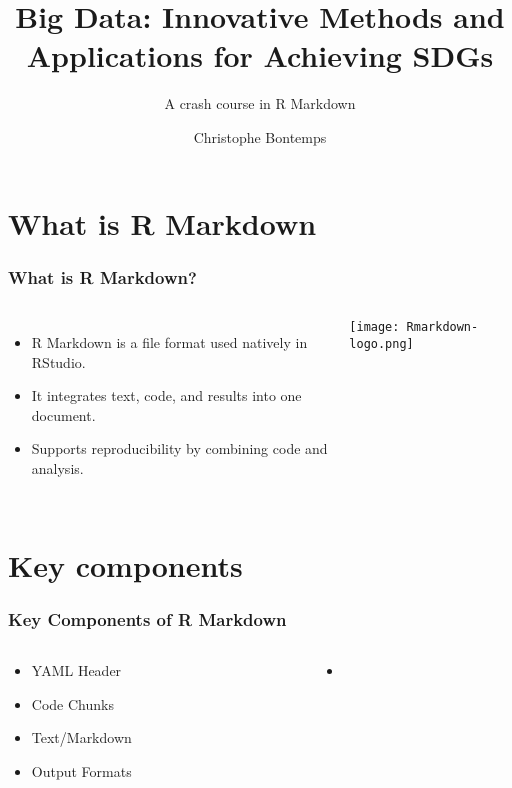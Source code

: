 \documentclass[xcolor=x11names,compress]{beamer}
\title{\textcolor{siap}{Big Data: Innovative Methods and Applications for Achieving SDGs \\ \vspace{0.5cm} }}
\subtitle{\textcolor{brique}{\Large{A crash course in R Markdown}}}
\author{Christophe Bontemps}
\institute{ \texttt{[image: SIAP\_logo\_Big.png]}}
\date{}
\renewcommand{\(}{\begin{columns}}
\renewcommand{\)}{\end{columns}}
\newcommand{\<}[1]{\begin{column}{#1}}
\renewcommand{\>}{\end{column}}
\begin{document}
\begin{frame}
    \titlepage
\end{frame}

\section{What is R Markdown}

\begin{frame}
    \frametitle{What is R Markdown?}
    \begin{columns}
            \begin{itemize}[<+->]
                \item R Markdown is a file format used natively in RStudio.
                \item It integrates text, code, and results into one document.
                \item Supports reproducibility by combining code and analysis.
            \end{itemize}
            \texttt{[image: Rmarkdown-logo.png]} %
    \end{columns}
\end{frame}

\section{Key components}
\begin{frame}
    \frametitle{Key Components of R Markdown}
    \begin{columns}
         \begin{column}{0.35\textwidth}
            \begin{itemize}[<+->]
                \item YAML Header
                \item Code Chunks
                \item Text/Markdown
                \item Output Formats
            \end{itemize}
        \end{column}
        \begin{column}{0.65\textwidth}
            \begin{itemize}
            \item[]
            \end{itemize}
         \end{column}   
    \end{columns}
\end{frame}
\end{document}
